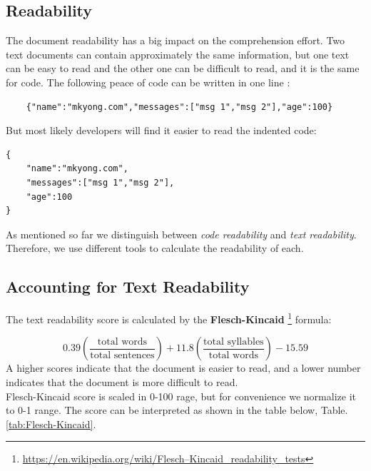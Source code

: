 \documentclass[12pt,mscthesis]{usiinfthesis}
\begin{document}
	\subsection{Readability} 
		The document readability has a big impact on the comprehension effort. Two text documents can contain approximately the same information, but one text can be easy to read and the other one can be difficult to read, and it is the same for code. The following peace of code can be written in one line :

		\begin{lstlisting}
	{"name":"mkyong.com","messages":["msg 1","msg 2"],"age":100}

		\end{lstlisting}	
	But most likely developers will find it easier to read the indented code:\\

	 	\begin{lstlisting}
{
	"name":"mkyong.com",
	"messages":["msg 1","msg 2"],
	"age":100
}
	\end{lstlisting}
 
	As mentioned so far we distinguish between \emph{code readability} and \emph{text readability}. Therefore, we use different tools to calculate the readability of each. 

\subsection{Accounting for Text Readability}
	The text readability score is calculated by the \textbf{Flesch-Kincaid} \footnote{\url{https://en.wikipedia.org/wiki/Flesch–Kincaid_readability_tests}} formula:
	

	\[0.39\left({\frac  {{\mbox{total words}}}{{\mbox{total sentences}}}}\right)+11.8\left({\frac  {{\mbox{total syllables}}}{{\mbox{total words}}}}\right)-15.59\]
	A higher scores indicate that the document is easier to read, and a lower number indicates that the document is more difficult to read.\\ 
	Flesch-Kincaid score is scaled in 0-100 rage, but for convenience we normalize it to 0-1 range. The score can be interpreted as shown in the table below, Table.\ref{tab:Flesch-Kincaid}.
	
\end{document}
